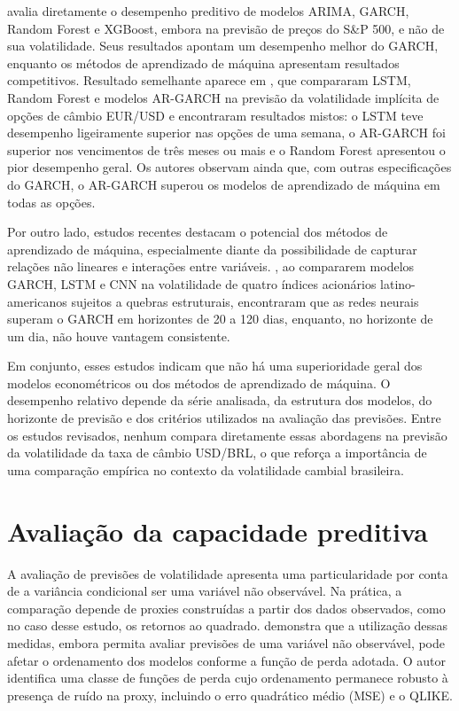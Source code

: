 \textcite{amoanu2025comparative} avalia diretamente o desempenho preditivo de modelos ARIMA, GARCH, Random Forest e XGBoost, embora na previsão de preços do S\&P 500, e não de sua volatilidade. Seus resultados apontam um desempenho 
melhor do GARCH, enquanto os métodos de aprendizado de máquina apresentam resultados competitivos. Resultado semelhante aparece em \textcite{olsen2025volatility}, que compararam LSTM, Random Forest e modelos AR-GARCH na previsão da volatilidade implícita de opções de câmbio EUR/USD e encontraram resultados mistos: o LSTM teve desempenho 
ligeiramente superior nas opções de uma semana, o AR-GARCH foi superior nos vencimentos de três meses ou mais e o Random Forest apresentou o pior desempenho geral. Os autores observam ainda que, com outras especificações do GARCH, o AR-GARCH 
superou os modelos de aprendizado de máquina em todas as opções.

Por outro lado, estudos recentes destacam o potencial dos métodos de aprendizado de máquina, especialmente diante da possibilidade de capturar relações não lineares e interações entre variáveis. \textcite{chung2025forecasting}, ao compararem 
modelos GARCH, LSTM e CNN na volatilidade de quatro índices acionários latino-americanos sujeitos a quebras estruturais, encontraram que as redes neurais superam o GARCH em horizontes de 20 a 120 dias, enquanto, no horizonte de um dia, não houve 
vantagem consistente.

Em conjunto, esses estudos indicam que não há uma superioridade geral dos modelos econométricos ou dos métodos de aprendizado de máquina. O desempenho relativo depende da série analisada, da estrutura dos 
modelos, do horizonte de previsão e dos critérios utilizados na avaliação das previsões. Entre os estudos revisados, nenhum compara diretamente essas abordagens na previsão da volatilidade da taxa de câmbio USD/BRL, o que reforça a importância de uma comparação empírica 
no contexto da volatilidade cambial brasileira.

\section{Avaliação da capacidade preditiva}

A avaliação de previsões de volatilidade apresenta uma particularidade por conta de a variância condicional ser uma variável não observável. Na prática, a comparação depende de proxies construídas a partir 
dos dados observados, como no caso desse estudo, os retornos ao quadrado. \textcite{patton2011volatility} demonstra que a utilização dessas medidas, embora permita avaliar previsões de uma variável não observável, pode 
afetar o ordenamento dos modelos conforme a função de perda adotada. O autor identifica uma classe de funções de perda cujo ordenamento permanece robusto à presença de ruído na proxy, incluindo o erro quadrático 
médio (MSE) e o QLIKE.

